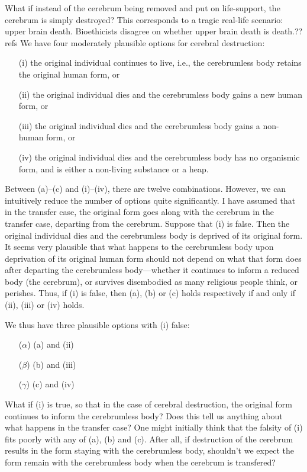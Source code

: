 What if instead of the cerebrum being removed and put on life-support, the cerebrum is simply destroyed? This corresponds
to a tragic real-life scenario: upper brain death. Bioethicists disagree on whether upper brain death is death.??refs
We have four moderately plausible options for cerebral destruction:
\begin{itemize}
\item[(i)] the original individual continues to live, i.e., the cerebrumless body retains the original human form, or
\item[(ii)] the original individual dies and the cerebrumless body gains a new human form, or
\item[(iii)] the original individual dies and the cerebrumless body gains a non-human form, or
\item[(iv)] the original individual dies and the cerebrumless body has no organismic form, and is either a non-living substance or a heap.
\end{itemize}

Between (a)--(c) and (i)--(iv), there are twelve combinations. 
However, we can intuitively reduce the number of options quite significantly. I have assumed that in the transfer
case, the original form goes along with the cerebrum in the transfer case, departing from the cerebrum. Suppose that
(i) is false. Then the original individual dies and the cerebrumless body is deprived of its original form. It seems
very plausible that what happens to the cerebrumless body upon deprivation of its original human form should not depend
on what that form does after departing the cerebrumless body---whether it continues to inform a reduced body (the cerebrum), 
or survives disembodied as many religious people think, or perishes. Thus, if (i) is false, then (a), (b) or (c) holds
respectively if and only if (ii), (iii) or (iv) holds. 

We thus have three plausible options with (i) false:
\begin{itemize}
\item[($\alpha$)] (a) and (ii)
\item[($\beta$)] (b) and (iii)
\item[($\gamma$)] (c) and (iv)
\end{itemize}

What if (i) is true, so that in the case of cerebral destruction, the original form continues to inform the cerebrumless body? 
Does this  tell us anything about what happens in the transfer case? One might initially think that the falsity of (i) fits
poorly with any of (a), (b) and (c). After all, if destruction of the cerebrum results in the form staying with the cerebrumless
body, shouldn't we expect the form remain with the cerebrumless body when the cerebrum is transfered?

